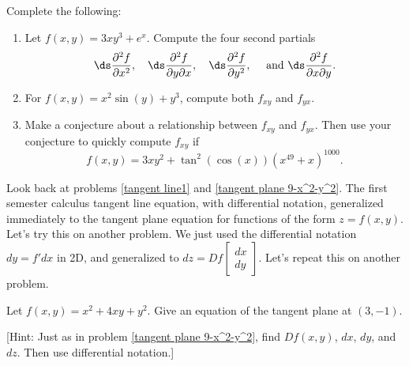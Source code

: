 \begin{problem}\label{second partials agree}%
Complete the following:
\begin{enumerate}
 \item Let $f(x,y)=3xy^3+e^{x}.$
Compute the four second partials $$\ds \frac{\partial^2 f}{ \partial x^2},\quad \ds\frac{\partial^2 f}{\partial y \partial x},\quad \ds\frac{\partial^2 f}{\partial y^2}, \quad \text{ and }\ds\frac{\partial^2 f}{\partial x \partial y}.$$
 \item For $f(x,y)=x^2\sin(y)+y^3$, compute both $f_{xy}$ and $f_{yx}$.  
 \item Make a conjecture about a relationship between $f_{xy}$ and $f_{yx}$. Then use your conjecture to quickly compute $f_{xy}$ if $$f(x,y)=3xy^2+\tan^{2}(\cos(x)) (x^{49}+x)^{1000}.$$ 
\end{enumerate}
\end{problem}

\newpage

Look back at problems \ref{tangent line1} and \ref{tangent plane 9-x^2-y^2}.  The first semester calculus tangent line equation, with differential notation, generalized immediately to the tangent plane equation for functions of the form $z=f(x,y)$. Let's try this on another problem. 
We just used the differential notation $dy=f'dx$ in 2D, and generalized to $dz = Df \begin{bmatrix}dx\\dy\end{bmatrix}$. Let's repeat this on another problem.

\begin{problem}[Day 3] %
%
 Let $f(x,y)=x^2+4xy+y^2$. Give an equation of the tangent plane at $(3,-1)$. 

 [Hint: Just as in problem \ref{tangent plane 9-x^2-y^2}, find $Df(x,y)$, $dx$, $dy$, and $dz$.  Then use differential notation.]
\end{problem}

